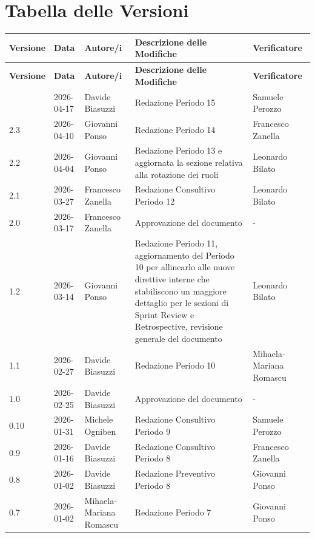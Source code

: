 \documentclass[a4paper, 11pt, oneside]{scrartcl} %
\begin{document}
\section*{Tabella delle Versioni}
\vspace{0.2cm}
{%
\renewcommand{\arraystretch}{1.2}
\setlength{\LTleft}{-0.4cm}
\setlength{\LTright}{0pt}
\begin{longtable}{@{}llp{}p{}p{}@{}}
    \toprule
    \textbf{Versione} & \textbf{Data} & \textbf{Autore/i} & \textbf{Descrizione delle Modifiche} & \textbf{Verificatore} \\
    \midrule
    \endfirsthead
    \toprule
    \textbf{Versione} & \textbf{Data} & \textbf{Autore/i} & \textbf{Descrizione delle Modifiche} & \textbf{Verificatore} \\
    \midrule
    \endhead
    \bottomrule
    \endfoot
    \bottomrule
    \endlastfoot
2.4 & 2026-04-17 & Davide Biasuzzi & Redazione Periodo 15 & Samuele Perozzo \\
2.3 & 2026-04-10 & Giovanni Ponso & Redazione Periodo 14 & Francesco Zanella \\
2.2 & 2026-04-04 & Giovanni Ponso & Redazione Periodo 13 e aggiornata la sezione relativa alla rotazione dei ruoli & Leonardo Bilato \\
2.1 & 2026-03-27 & Francesco Zanella & Redazione Consultivo Periodo 12 & Leonardo Bilato \\
2.0 & 2026-03-17 & Francesco Zanella & Approvazione del documento & - \\
1.2 & 2026-03-14 & Giovanni Ponso & Redazione Periodo 11, aggiornamento del Periodo 10 per allinearlo alle nuove direttive interne che stabiliscono un maggiore dettaglio per le sezioni di Sprint Review e Retrospective, revisione generale del documento & Leonardo Bilato \\
1.1 & 2026-02-27 & Davide Biasuzzi & Redazione Periodo 10 & Mihaela-Mariana Romascu \\
1.0 & 2026-02-25 & Davide Biasuzzi & Approvazione del documento & - \\
0.10 & 2026-01-31 & Michele Ogniben & Redazione Consultivo Periodo 9 & Samuele Perozzo \\
0.9 & 2026-01-16 & Davide Biasuzzi & Redazione Consultivo Periodo 8 & Francesco Zanella \\
0.8 & 2026-01-02 & Davide Biasuzzi & Redazione Preventivo Periodo 8 & Giovanni Ponso \\
0.7 & 2026-01-02 & Mihaela-Mariana Romascu & Redazione Periodo 7 & Giovanni Ponso \\

\end{longtable}}
\end{document}

